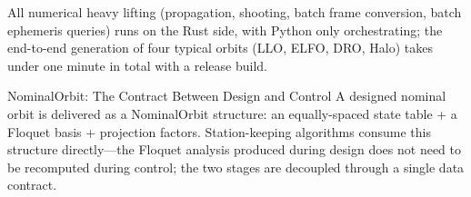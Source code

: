 \begin{center}
\end{center}

All numerical heavy lifting (propagation, shooting, batch frame conversion,
batch ephemeris queries) runs on the Rust side, with Python only
orchestrating; the end-to-end generation of four typical orbits (LLO, ELFO,
DRO, Halo) takes under one minute in total with a release build.

\begin{keybox}{NominalOrbit: The Contract Between Design and Control}
A designed nominal orbit is delivered as a NominalOrbit structure: an
equally-spaced state table + a Floquet basis + projection factors.
Station-keeping algorithms consume this structure directly---the Floquet
analysis produced during design does not need to be recomputed during
control; the two stages are decoupled through a single data contract.
\end{keybox}
